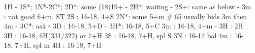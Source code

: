 1H - 1S*; 1N*-2C*; 
2D*: some (18)19+
   - 2H*: waiting
        - 2S+: same as below
   - 3m : nat good 6+m, ST
2S : 16-18, 4+S
2N*: some 5+m  # 65 usually bids 3m then 4m
   - 3C*: ask
        - 3D : 16-18, 5+D
        - 3H*: 16-18, 5+C
3m : 16-18, 4+m
   - 3H : 2H
3H : 16-18, 6H(331/322) or 7+H
3S : 16-18, 7+H, spl S
3N : 16-17 bal
4m : 16-18, 7+H, spl m
4H : 16-18, 7+H